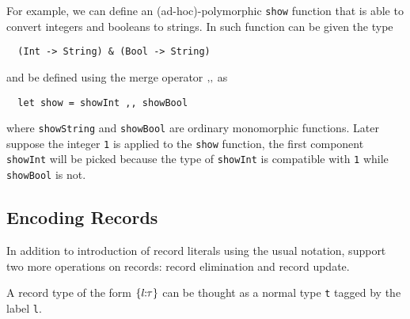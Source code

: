 For example, we can define an (ad-hoc)-polymorphic \lstinline{show} function
that is able to convert integers and booleans to strings. In \name such function
can be given the type
\begin{lstlisting}
  (Int -> String) & (Bool -> String)
\end{lstlisting}
and be defined using the merge operator $ ,\!, $ as
\begin{lstlisting}
  let show = showInt ,, showBool
\end{lstlisting}
where \lstinline{showString} and \lstinline{showBool} are ordinary monomorphic
functions. Later suppose the integer \lstinline{1} is applied to the \lstinline{show} function,
the first component \lstinline{showInt} will be picked because the type of \lstinline{showInt}
is compatible with \lstinline{1} while \lstinline{showBool} is not.








\subsection{Encoding Records}

In addition to introduction of record literals using the usual notation, \name
support two more operations on records: record elimination and record update.

A record type of the form $ \{ {l} \!\!:\!\! {\tau} \} $ can be thought as a normal type \lstinline{t}
tagged by the label \lstinline{l}.

